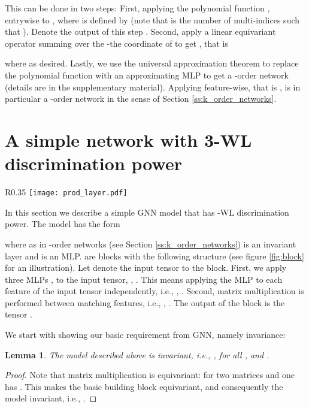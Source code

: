\documentclass{article}
\newtheorem{lemma}{Lemma}
\newcommand{\ie}{{i.e.}}
\begin{document}
This can be done in two steps: First, applying the polynomial function ,  entrywise to , where  is defined by  (note that  is the number of multi-indices  such that ). Denote the output of this step . Second, apply a linear equivariant operator summing over the -the coordinate of  to get , that is
  
where  as desired. Lastly, we use the universal approximation theorem \citep{cybenko1989approximation,hornik1991approximation} to replace the polynomial function  with an approximating MLP  to get a -order network (details are in the supplementary material). Applying  feature-wise, that is , is in particular a -order network in the sense of Section \ref{ss:k_order_networks}.  

\section{A simple network with 3-WL discrimination  power}\label{s:3WL_network}

\begin{wrapfigure}[12]{R}{0.35\textwidth}
\vspace*{-8pt}\hspace{-5pt}
\texttt{[image: prod\_layer.pdf]}
\caption{Block structure.}\label{fig:block}
\end{wrapfigure}
In this section we describe a simple GNN model that has -WL discrimination power. The model has the form 

where as in -order networks (see Section \ref{ss:k_order_networks})  is an invariant layer and  is an MLP.  are blocks with the following structure (see figure \ref{fig:block} for an illustration). Let  denote the input tensor to the block. First, we apply three MLPs ,  to the input tensor, , . This means applying the MLP to each feature of the input tensor independently, \ie, , . Second, matrix multiplication is performed between matching features, \ie, , . The output of the block is the tensor  .  

We start with showing our basic requirement from GNN, namely invariance:
\begin{lemma}\label{lem:qmlp_invariance}
The model  described above is invariant, \ie, , for all , and .
\end{lemma}
\begin{proof}
Note that matrix multiplication is equivariant: for two matrices  and  one has . This makes the basic building block  equivariant, and consequently the model  invariant, \ie,  . 
\end{proof}
\end{document}
